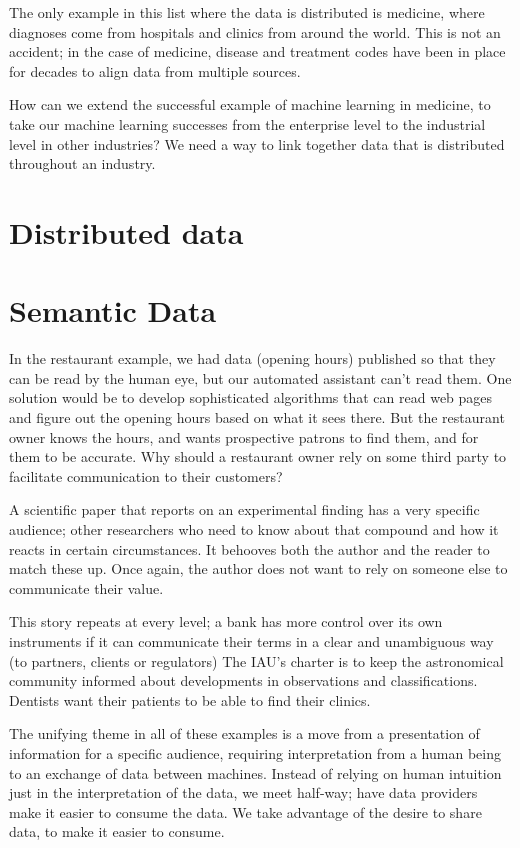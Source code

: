 The only example in this list where the data is distributed is medicine, where diagnoses come 
from hospitals and clinics from around the world.  This is not an accident; in the case of medicine, 
disease and treatment codes have been in place for decades to align data from multiple sources. 

How can we extend the successful example of machine learning in medicine, to take 
our machine learning successes from the enterprise level to the industrial level in other industries? 
We need a way to link together data that is distributed throughout an industry. 


\section{Distributed data}




\section{Semantic Data}

In the restaurant example, we had data (opening hours) published so that they 
can be read by the human eye, but our automated assistant can't read them.  One solution 
would be to develop sophisticated algorithms that can read web pages and figure out
the opening hours based on what it sees there.  But the restaurant owner knows the hours, 
and wants prospective patrons to find them, and for them to be accurate.  Why should 
a restaurant owner rely on some third party to facilitate communication to their customers?  

A scientific paper that reports on an experimental finding has a very specific audience;
other researchers who need to know about that compound and how it reacts in certain circumstances. 
It behooves both the author and the reader to match these up.  Once again, the author does not
want to rely on someone else to communicate their value. 

This story repeats at every level; a bank has more control over its own instruments if it 
can communicate their terms in a clear and unambiguous way (to partners, clients or regulators)
The IAU's charter is to keep the astronomical community informed about developments in 
observations and classifications.  Dentists want their patients to be able to find their clinics. 

The unifying theme in all of these examples is a move from a presentation of information 
for a specific audience, requiring interpretation from a human being to an exchange of data
between machines.  Instead of relying on human intuition just in the interpretation of the
data, we meet half-way; have data providers make it easier to consume the data.  We take advantage of 
the desire to share data, to make it easier to consume. 

